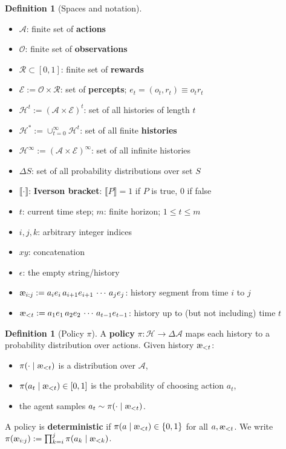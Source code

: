 \documentclass[fontsize=11pt, parskip=half]{scrartcl}
\theoremstyle{definition}
\newtheorem{definition}[theorem]{Definition}
\newcommand{\cA}{\mathcal{A}}
\newcommand{\cO}{\mathcal{O}}
\newcommand{\cR}{\mathcal{R}}
\newcommand{\cE}{\mathcal{E}}
\newcommand{\cH}{\mathcal{H}}
\newcommand{\aes}{\textnormal{\ae}}
\begin{document}
\begin{definition}[Spaces and notation]\label{def:spaces}\
\begin{itemize}\itemsep=2pt
    \item $\cA$: finite set of \textbf{actions}
    \item $\cO$: finite set of \textbf{observations}
    \item $\cR \subset [0,1]$: finite set of \textbf{rewards}
    \item $\cE := \cO \times \cR$: set of \textbf{percepts}; $e_t = (o_t, r_t) \equiv o_tr_t$
    \item $\cH^t := (\cA \times \cE)^t$: set of all histories of length $t$
    \item $\cH^* := \cup_{t=0}^\infty \cH^t$: set of all finite \textbf{histories}
    \item $\cH^\infty := (\cA \times \cE)^\infty$: set of all infinite histories
    \item $\Delta S$: set of all probability distributions over set $S$
    \item $\llbracket \cdot \rrbracket$: \textbf{Iverson bracket}: $\llbracket P \rrbracket = 1$ if $P$ is true, $0$ if false
    \item $t$: current time step; $m$: finite horizon; $1 \leq t \leq m$
    \item $i, j, k$: arbitrary integer indices
    \item $xy$: concatenation
    \item $\epsilon$: the empty string/history 
    \item $\aes_{i:j} := a_i e_i\, a_{i+1} e_{i+1} \,\cdots\, a_j e_j$: history segment from time $i$ to $j$
    \item $\aes_{<t} := a_1 e_1\, a_2 e_2 \,\cdots\, a_{t-1} e_{t-1}$: history up to (but not including) time $t$
\end{itemize}
\end{definition}

\begin{definition}[Policy $\pi$]\label{def:policy}
A \textbf{policy} $\pi : \cH \to \Delta \cA$ maps each history to a probability distribution over actions. Given history $\aes_{<t}$:
\begin{itemize}\itemsep=2pt
    \item $\pi(\cdot \mid \aes_{<t})$ is a distribution over $\cA$,
    \item $\pi(a_t \mid \aes_{<t}) \in [0,1]$ is the probability of choosing action $a_t$,
    \item the agent samples $a_t \sim \pi(\cdot \mid \aes_{<t})$.
\end{itemize}
A policy is \textbf{deterministic} if $\pi(a \mid \aes_{<t}) \in \{0,1\}$ for all $a, \aes_{<t}$.
We write $\pi(\aes_{i:j}) := \prod_{k=i}^j \pi(a_k \mid \aes_{<k})$.
\end{definition}
\end{document}
